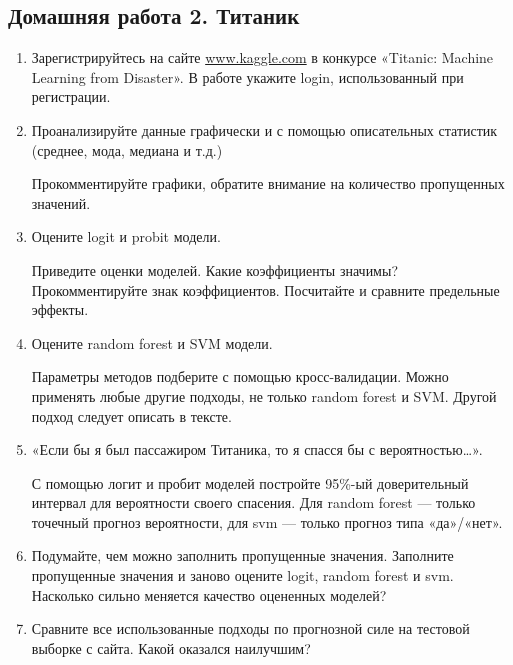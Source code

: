 \documentclass[12pt, a4paper]{article}
\begin{document}
\subsection{Домашняя работа 2. Титаник}



\begin{enumerate}

\item Зарегистрируйтесь на сайте \url{www.kaggle.com}  в конкурсе «Titanic: Machine Learning from Disaster». В работе укажите login, использованный при регистрации.

\item Проанализируйте данные графически и с помощью описательных статистик (среднее, мода, медиана и т.д.)

Прокомментируйте графики, обратите внимание на количество пропущенных значений.

\item Оцените logit и probit модели.

Приведите оценки моделей. Какие коэффициенты значимы? Прокомментируйте знак коэффициентов. Посчитайте и сравните предельные эффекты.

\item Оцените random forest и SVM модели.

Параметры методов подберите с помощью кросс-валидации. Можно применять любые другие подходы, не только random forest и SVM. Другой подход следует описать в тексте.


\item «Если бы я был пассажиром Титаника, то я спасся бы с вероятностью\ldots».

С помощью логит и пробит моделей постройте 95\%-ый доверительный интервал для вероятности своего спасения. Для random forest — только точечный прогноз вероятности, для svm — только прогноз типа «да»/«нет».


\item Подумайте, чем можно заполнить пропущенные значения. Заполните пропущенные значения и заново оцените logit, random forest и svm. Насколько сильно меняется качество оцененных моделей?


\item Сравните все использованные подходы по прогнозной силе на тестовой выборке с сайта. Какой оказался наилучшим?


\end{enumerate}
\end{document}
